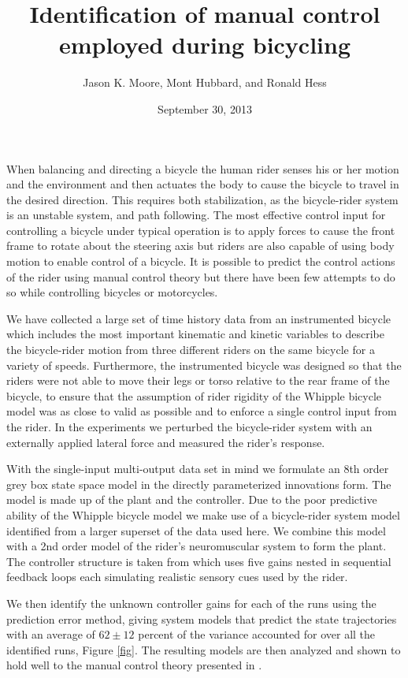 \documentclass[a4paper]{article}
\title{Identification of manual control employed during bicycling}
\author{Jason K. Moore, Mont Hubbard, and Ronald Hess}
\date{September 30, 2013}
\begin{document}
\maketitle

When balancing and directing a bicycle the human rider senses his or her motion
and the environment and then actuates the body to cause the bicycle to travel
in the desired direction. This requires both stabilization, as the
bicycle-rider system is an unstable system, and path following. The most
effective control input for controlling a bicycle under typical operation is to
apply forces to cause the front frame to rotate about the steering axis but
riders are also capable of using body motion to enable control of a bicycle.
It is possible to predict the control actions of the rider using manual control
theory but there have been few attempts to do so while controlling bicycles or
motorcycles.

We have collected a large set of time history data from an instrumented bicycle
which includes the most important kinematic and kinetic variables to describe
the bicycle-rider motion from three different riders on the same bicycle for a
variety of speeds. Furthermore, the instrumented bicycle was designed so that
the riders were not able to move their legs or torso relative to the rear frame
of the bicycle, to ensure that the assumption of rider rigidity of the Whipple
bicycle model was as close to valid as possible and to enforce a single control
input from the rider. In the experiments we perturbed the bicycle-rider system
with an externally applied lateral force and measured the rider's response.

With the single-input multi-output data set in mind we formulate an 8th order
grey box state space model \cite{Ljung1998} in the directly parameterized
innovations form. The model is made up of the plant and the controller. Due to
the poor predictive ability of the Whipple bicycle model we make use of a
bicycle-rider system model identified from a larger superset of the data used
here. We combine this model with a 2nd order model of the rider's neuromuscular
system to form the plant. The controller structure is taken from
\cite{Hess2012} which uses five gains nested in sequential feedback loops each
simulating realistic sensory cues used by the rider.

We then identify the unknown controller gains for each of the runs using the
prediction error method, giving system models that predict the state
trajectories with an average of $62 \pm 12$ percent of the variance accounted
for over all the identified runs, Figure \ref{fig}. The resulting models are
then analyzed and shown to hold well to the manual control theory presented in
\cite{Hess2012}.
\end{document}
